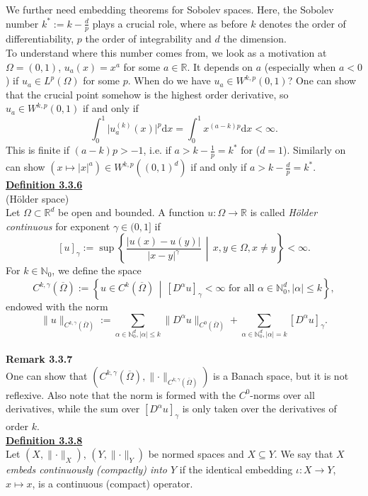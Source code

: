 We further need embedding theorems for Sobolev spaces. Here, the Sobolev number $k^*:=k-\frac{d}{p}$ plays a crucial role, where as before $k$ denotes the order of differentiability, $p$ the order of integrability and $d$ the dimension.\\

To understand where this number comes from, we look as a motivation at $\Omega=(0,1)$, $u_a(x)=x^a$ for some $a\in\mathbb{R}$. It depends on $a$ (especially when $a<0$) if $u_a\in L^p(\Omega)$ for some $p$. When do we have $u_a\in W^{k,p}(0,1)$? One can show that the crucial point somehow is the highest order derivative, so $u_a\in W^{k,p}(0,1)$ if and only if
\[\int_0^1{\lvert u_a^{(k)}(x)\rvert^p\mathrm{d}x}=\int_0^1{x^{(a-k)p}\mathrm{d}x}<\infty.\]
This is finite if $(a-k)p>-1$, i.e. if $a>k-\frac{1}{p}=k^*$ for ($d=1$). Similarly on can show $(x\mapsto\lvert x\rvert^a)\in W^{k,p}((0,1)^d)$ if and only if $a>k-\frac{d}{p}=k^*$.\\[11pt]

\textbf{\underline{Definition 3.3.6}}\\
(H\"older space)\\
Let $\Omega\subset\mathbb{R}^d$ be open and bounded. A function $u:\Omega\longrightarrow\mathbb{R}$ is called \textit{H\"older continuous} for exponent $\gamma\in(0,1]$ if
\[[u]_\gamma:=\sup\left\{\frac{\lvert u(x)-u(y)\rvert}{\lvert x-y\rvert^\gamma}\,\middle\vert\,x,y\in\Omega,x\ne y\right\}<\infty.\]
For $k\in\mathbb{N}_0$, we define the space
\[C^{k,\gamma}(\overline{\Omega}):=\left\{u\in C^k(\overline{\Omega})\,\middle\vert\,[D^\alpha u]_\gamma<\infty\text{ for all }\alpha\in\mathbb{N}_0^d,\lvert\alpha\rvert\leq k\right\},\]
endowed with the norm
\[\lVert u\rVert_{C^{k,\gamma}(\overline{\Omega})}:=\sum_{\alpha\in\mathbb{N}_0^d,\lvert\alpha\rvert\leq k}{\lVert D^\alpha u\rVert_{C^0(\overline{\Omega})}}+\sum_{\alpha\in\mathbb{N}_0^d,\lvert\alpha\rvert=k}{[D^\alpha u]_\gamma}.\]\\
	
\textbf{Remark 3.3.7}\\
One can show that $(C^{k,\gamma}(\overline{\Omega}),\lVert\cdot\rVert_{C^{k,\gamma}(\overline{\Omega})})$ is a Banach space, but it is not reflexive. Also note that the norm is formed with the $C^0$-norms over all derivatives, while the sum over $[D^\alpha u]_\gamma$ is only taken over the derivatives of order $k$.\\[11pt]

\textbf{\underline{Definition 3.3.8}}\\
Let $(X,\lVert\cdot\rVert_X)$, $(Y,\lVert\cdot\rVert_Y)$ be normed spaces and $X\subseteq Y$. We say that \textit{$X$ embeds continuously (compactly) into $Y$} if the identical embedding $\iota:X\longrightarrow Y$, $x\longmapsto x$, is a continuous (compact) operator.\\

